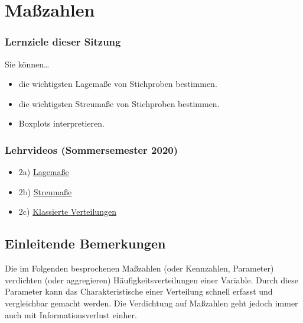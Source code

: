 \documentclass[
  11pt,
  ngerman,
  a4paper,
]{report}
\providecommand{\tightlist}{%
  \setlength{\itemsep}{0pt}\setlength{\parskip}{0pt}}
\begin{document}
\hypertarget{mauxdfzahlen}{%
\chapter{Maßzahlen}\label{mauxdfzahlen}}

\hypertarget{lernziele-dieser-sitzung-1}{%
\subsection*{Lernziele dieser Sitzung}\label{lernziele-dieser-sitzung-1}}

Sie können\ldots{}

\begin{itemize}
\tightlist
\item
  die wichtigsten Lagemaße von Stichproben bestimmen.
\item
  die wichtigsten Streumaße von Stichproben bestimmen.
\item
  Boxplots interpretieren.
\end{itemize}

\hypertarget{lehrvideos-sommersemester-2020-1}{%
\subsection*{Lehrvideos (Sommersemester 2020)}\label{lehrvideos-sommersemester-2020-1}}

\begin{itemize}
\tightlist
\item
  2a) \href{https://video01.uni-frankfurt.de/Mediasite/Play/bbb30f8025cf48e99a48700b0600e1e11d}{Lagemaße}
\item
  2b) \href{https://video01.uni-frankfurt.de/Mediasite/Play/cfdb254c058f44228e7b026f36986cc31d}{Streumaße}
\item
  2c) \href{https://video01.uni-frankfurt.de/Mediasite/Play/d115769da4ee4e25a9062a9b2e2e11c41d}{Klassierte Verteilungen}
\end{itemize}

\hypertarget{einleitende-bemerkungen}{%
\section{Einleitende Bemerkungen}\label{einleitende-bemerkungen}}

Die im Folgenden besprochenen Maßzahlen (oder Kennzahlen, Parameter) verdichten (oder aggregieren) Häufigkeitsverteilungen einer Variable. Durch diese Parameter kann das Charakteristische einer Verteilung schnell erfasst und vergleichbar gemacht werden. Die Verdichtung auf Maßzahlen geht jedoch immer auch mit Informationsverlust einher.
\end{document}
